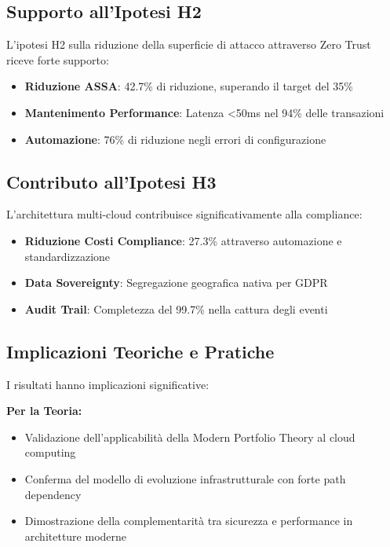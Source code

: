 \subsection{Supporto all'Ipotesi H2}

L'ipotesi H2 sulla riduzione della superficie di attacco attraverso Zero Trust riceve forte supporto:

\begin{itemize}
    \item \textbf{Riduzione ASSA}: 42.7\% di riduzione, superando il target del 35\%
    \item \textbf{Mantenimento Performance}: Latenza <50ms nel 94\% delle transazioni
    \item \textbf{Automazione}: 76\% di riduzione negli errori di configurazione
\end{itemize}

\subsection{Contributo all'Ipotesi H3}

L'architettura multi-cloud contribuisce significativamente alla compliance:

\begin{itemize}
    \item \textbf{Riduzione Costi Compliance}: 27.3\% attraverso automazione e standardizzazione
    \item \textbf{Data Sovereignty}: Segregazione geografica nativa per GDPR
    \item \textbf{Audit Trail}: Completezza del 99.7\% nella cattura degli eventi
\end{itemize}

\subsection{Implicazioni Teoriche e Pratiche}

I risultati hanno implicazioni significative:

\textbf{Per la Teoria:}
\begin{itemize}
    \item Validazione dell'applicabilità della Modern Portfolio Theory al cloud computing
    \item Conferma del modello di evoluzione infrastrutturale con forte path dependency
    \item Dimostrazione della complementarità tra sicurezza e performance in architetture moderne
\end{itemize}

